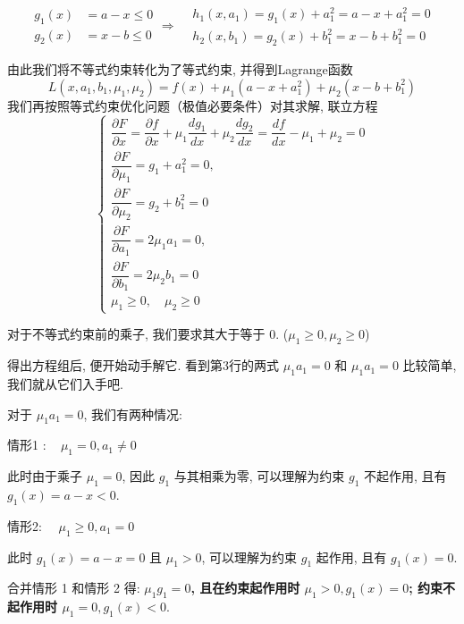 $$\begin{aligned}
    g_1(x) &= a - x \le 0 \\
    g_2(x) &= x - b \le 0
\end{aligned} \Rightarrow \begin{aligned}
    &h_{1}\left(x, a_{1}\right)=g_{1}(x)+a_{1}^{2}=a-x+a_{1}^{2}=0\\
    &h_{2}\left(x, b_{1}\right)=g_{2}(x)+b_{1}^{2}=x-b+b_{1}^{2}=0
\end{aligned}$$


由此我们将不等式约束转化为了等式约束, 并得到Lagrange函数
$$
L\left(x, a_{1}, b_{1}, \mu_{1}, \mu_{2}\right)=f(x)+\mu_{1}\left(a-x+a_{1}^{2}\right)+\mu_{2}\left(x-b+b_{1}^{2}\right)
$$
我们再按照等式约束优化问题（极值必要条件）对其求解, 联立方程
$$
\left\{\begin{array}{l}
\dfrac{\partial F}{\partial x}=\dfrac{\partial f}{\partial x}+\mu_{1} \dfrac{d g_{1}}{d x}+\mu_{2} \dfrac{d g_{2}}{d x}=\dfrac{d f}{d x}-\mu_{1}+\mu_{2}=0 \\
\dfrac{\partial F}{\partial \mu_{1}}=g_{1}+a_{1}^{2}=0, \\ 
\dfrac{\partial F}{\partial \mu_{2}}=g_{2}+b_{1}^{2}=0 \\
\dfrac{\partial F}{\partial a_{1}}=2 \mu_{1} a_{1}=0, \\ 
\dfrac{\partial F}{\partial b_{1}}=2 \mu_{2} b_{1}=0 \\
\mu_{1} \geq 0, \quad \mu_{2} \geq 0
\end{array}\right.
$$

\begin{remark}
    对于不等式约束前的乘子, 我们要求其大于等于 0. ($\mu_{1} \geq 0, \mu_{2} \geq 0$)
\end{remark}

得出方程组后, 便开始动手解它. 看到第3行的两式 $\mu_{1} a_{1}=0$ 和 $\mu_{1} a_{1}=0$ 比较简单, 我们就从它们入手吧.

对于 $\mu_{1} a_{1}=0$, 我们有两种情况:

情形1 $: \quad \mu_{1}=0, a_{1} \neq 0$

此时由于乘子 $\mu_{1}=0$, 因此 $g_{1}$ 与其相乘为零, 可以理解为约束 $g_{1}$ 不起作用, 且有 $g_{1}(x)=a-x<0 .$

情形2: $\quad \mu_{1} \geq 0, a_{1}=0$

此时 $g_{1}(x)=a-x=0$ 且 $\mu_{1}>0$, 可以理解为约束 $g_{1}$ 起作用, 且有 $g_{1}(x)=0$.

合并情形 1 和情形 2 得: \textbf{$\mu_{1} g_{1}=0$, 且在约束起作用时 $\mu_{1}>0, g_{1}(x)=0$; 约束不起作用时 $\mu_{1}=0, g_{1}(x)<0 .$}


